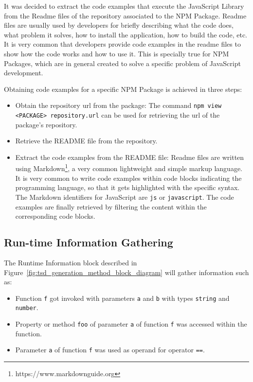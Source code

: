 \documentclass[a4paper,english,cleveref, autoref]{lipics-v2019}
\newcommand{\figref}[1]{Figure~\ref{#1}}
\begin{document}
It was decided to extract the code examples that execute the JavaScript Library from the Readme files of the repository associated to the NPM Package. Readme files are usually used by developers for briefly describing what the code does, what problem it solves, how to install the application, how to build the code, etc. It is very common that developers provide code examples in the readme files to show how the code works and how to use it. This is specially true for NPM Packages, which are in general created to solve a specific problem of JavaScript development.

Obtaining code examples for a specific NPM Package is achieved in three steps:
\begin{itemize}
  \item Obtain the repository url from the package: The command \lstinline{npm view <PACKAGE> repository.url} can be used for retrieving the url of the package's repository.

  \item Retrieve the README file from the repository.

  \item Extract the code examples from the README file: Readme files are written using Markdown\footnote{https://www.markdownguide.org}, a very common lightweight and simple markup language. It is very common to write code examples within code blocks indicating the programming language, so that it gets highlighted with the specific syntax. The Markdown identifiers for JavaScript are \lstinline{js} or \lstinline{javascript}. The code examples are finally retrieved by filtering the content within the corresponding code blocks.
\end{itemize}

\subsection{Run-time Information Gathering}
The Runtime Information block described in \figref{fig:tsd_generation_method_block_diagram} will gather information such as:

\begin{itemize}
  \item Function \lstinline{f} got invoked with parameters \lstinline{a} and \lstinline{b} with types \lstinline{string} and \lstinline{number}.
  \item Property or method \lstinline{foo} of parameter \lstinline{a} of function \lstinline{f} was accessed within the function.
  \item Parameter \lstinline{a} of function \lstinline{f} was used as operand for operator \lstinline{==}.
\end{itemize}
\end{document}
